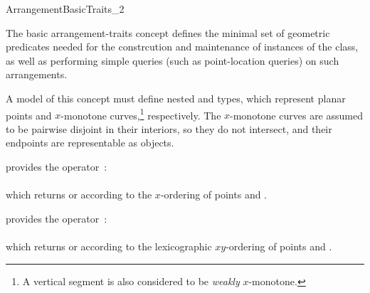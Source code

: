 
\ccRefPageBegin

\begin{ccRefConcept}{ArrangementBasicTraits_2}

\ccDefinition

The basic arrangement-traits concept defines the minimal set of geometric
predicates needed for the constrcution and maintenance of instances of the
 class, as well as performing simple queries (such as
point-location queries) on such arrangements.

A model of this concept must define nested  and
 types, which represent planar points and
$x$-monotone curves,\footnote{A vertical segment is also considered to be
{\sl weakly} $x$-monotone.} respectively. The $x$-monotone curves are assumed
to be pairwise disjoint in their interiors, so they do not intersect, and
their endpoints are representable as  objects.

\ccTypes






\ccThreeToTwo

{provides the operator~: \\
  \\
 which returns  or  according to the
 $x$-ordering of points  and .}

{provides the operator~: \\
  \\
 which returns  or  according to the
 lexicographic $xy$-ordering of points  and .}


\end{ccRefConcept}
